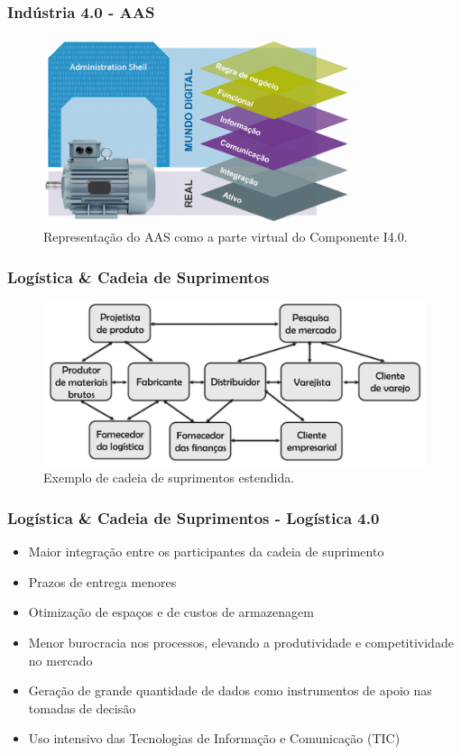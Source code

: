 \documentclass[10pt]{beamer}
\begin{document}
\begin{frame}
	\frametitle{Indústria 4.0 - AAS} 
	
	\begin{figure}[htb]
		\centering
		\caption{Representação do AAS como a parte virtual do Componente I4.0.}
		\label{fig:aas-rami}
		\includegraphics[width=0.8\textwidth]{aas-rami.png}
	\end{figure}
	
\end{frame}
\begin{frame}
	\frametitle{Logística \& Cadeia de Suprimentos} 
	
	\begin{figure}[htb]
		\centering
		\caption{Exemplo de cadeia de suprimentos estendida.}
		\label{fig:cadeia-de-suprimentos}
		\includegraphics[width=1\textwidth]{cadeia-de-suprimentos.png}
	\end{figure}
	
\end{frame}
\begin{frame}
	\frametitle{Logística \& Cadeia de Suprimentos - Logística 4.0}
	
	\begin{itemize}
		\item Maior integração entre os participantes da cadeia de suprimento
		\item Prazos de entrega menores
		\item Otimização de espaços e de custos de armazenagem
		\item Menor burocracia nos processos, elevando a produtividade e competitividade no mercado
		\item Geração de grande quantidade de dados como instrumentos de apoio nas tomadas de decisão
		\item Uso intensivo das Tecnologias de Informação e Comunicação (TIC)
	\end{itemize}
	
\end{frame}
\end{document}
